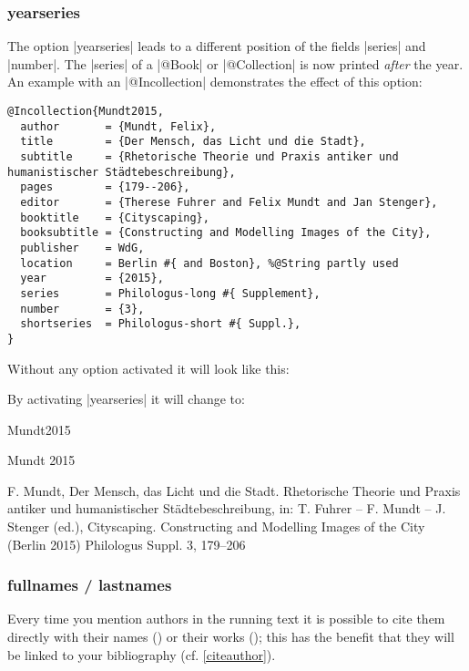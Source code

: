 \documentclass[a4paper,
10pt,
greek,
french,
spanish,
italian,
ngerman,
english
]{ltxdoc}
\begin{document}

\subsubsection{yearseries}\label{yearseries}
The option |yearseries| leads to a different position of the fields |series| and |number|.
The |series| of a |@Book| or |@Collection| is now printed \emph{after} the year.
An example with an |@Incollection| demonstrates the effect of this option:
 
\begin{lstlisting}[style=bibentry,label=Mundt2015,caption={{@}Incollection\{Mundt2015,…\}}]
@Incollection{Mundt2015,
  author       = {Mundt, Felix},
  title        = {Der Mensch, das Licht und die Stadt},
  subtitle     = {Rhetorische Theorie und Praxis antiker und humanistischer Städtebeschreibung},
  pages        = {179--206},
  editor       = {Therese Fuhrer and Felix Mundt and Jan Stenger},
  booktitle    = {Cityscaping},
  booksubtitle = {Constructing and Modelling Images of the City},
  publisher    = WdG,
  location     = Berlin #{ and Boston}, %@String partly used
  year         = {2015},
  series       = Philologus-long #{ Supplement},
  number       = {3},
  shortseries  = Philologus-short #{ Suppl.},
}
\end{lstlisting}

Without any option activated it will look like this:
 
By activating |yearseries| it will change to:
\begin{bibbsp}{Mundt2015}
\parbox[t]{1.7cm}{Mundt 2015} \parbox[t]{9cm}{F. Mundt, Der Mensch, das Licht und die Stadt. Rhetorische Theorie und Praxis antiker und humanistischer Städtebeschreibung, in: T. Fuhrer -- F. Mundt -- J. Stenger (ed.), Cityscaping. Constructing and Modelling Images of the City (Berlin 2015) {\color{red}Philologus Suppl. 3,} 179–206}
\end{bibbsp}

\subsubsection{fullnames / lastnames}\label{fullnames}\label{lastnames}
Every time you mention authors in the running text it is possible to cite them 
directly with their names () or their works  ();
this has the benefit that they will be linked to your bibliography (cf. \cref{citeauthor}).
\end{document}
